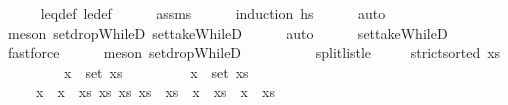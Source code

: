 \begin{isabellebody}
%
\isadelimproof
\ \ \ \ %
\endisadelimproof
%
\isatagproof
{}\isamarkupfalse%
\ leq{\isacharunderscore}{\kern0pt}def\ le{\isacharunderscore}{\kern0pt}def\isanewline
\ \ \ \ \isamarkupfalse%
\ assms\isanewline
\ \ \ \ \isamarkupfalse%
\ {\isacharparenleft}{\kern0pt}induction\ hs{\isacharparenright}{\kern0pt}\isanewline
\ \ \ \ \isamarkupfalse%
\ auto\isanewline
\ \ \ \ \isamarkupfalse%
\ {\isacharparenleft}{\kern0pt}meson\ set{\isacharunderscore}{\kern0pt}dropWhileD\ set{\isacharunderscore}{\kern0pt}takeWhileD{\isacharparenright}{\kern0pt}\isanewline
\ \ \ \ \isamarkupfalse%
\ auto{\isacharbrackleft}{\kern0pt}{}{\isacharbrackright}{\kern0pt}\isanewline
\ \ \ \ \isamarkupfalse%
\ set{\isacharunderscore}{\kern0pt}takeWhileD\ \isamarkupfalse%
\ fastforce\isanewline
\ \ \ \ \isamarkupfalse%
\ {\isacharparenleft}{\kern0pt}meson\ set{\isacharunderscore}{\kern0pt}dropWhileD{\isacharparenright}{\kern0pt}{\isacharplus}{\kern0pt}\isanewline
\ \ \ \ \isamarkupfalse%
%
\endisatagproof
{\isafoldproof}%
%
\isadelimproof
%
\endisadelimproof
\ \isanewline
\isanewline
\isanewline
\ \ \isamarkupfalse%
\ split{\isacharunderscore}{\kern0pt}list{}{\isacharunderscore}{\kern0pt}le{\isacharcolon}{\kern0pt}\isanewline
\ \ \ \ \ {\isachardoublequoteopen}strict{\isacharunderscore}{\kern0pt}sorted\ xs{\isachardoublequoteclose}\isanewline
\ \ \ \ \ \ \ \ \ {\isachardoublequoteopen}x\ {\isasymin}\ set\ xs{\isachardoublequoteclose}\isanewline
\ \ \ \ \ \ \ \ \ {\isachardoublequoteopen}x\ {\isasymin}\ set\ xs{\isachardoublequoteclose}\isanewline
\ \ \ \ \ {\isachardoublequoteopen}x\ {\isacharless}{\kern0pt}\ x\ {\isasymlongleftrightarrow}\ {\isacharparenleft}{\kern0pt}{\isasymexists}xs\ xs\ xs\ xs\ {\isacharequal}{\kern0pt}\ xs\ {\isacharat}{\kern0pt}\ x\ {\isacharhash}{\kern0pt}\ xs\ {\isacharat}{\kern0pt}\ x\ {\isacharhash}{\kern0pt}\ xs\isanewline
%
\isadelimproof
\ \ %

\end{isabellebody}
